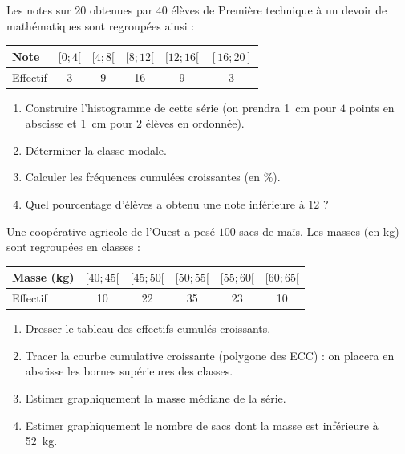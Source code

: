 \documentclass[11pt]{article}
\begin{document}
\begin{exercice}
Les notes sur $20$ obtenues par $40$ élèves de Première technique à un devoir de mathématiques sont regroupées ainsi :
\begin{center}
\begin{tabular}{|l|c|c|c|c|c|}
\hline
Note & $[0 ; 4[$ & $[4 ; 8[$ & $[8 ; 12[$ & $[12 ; 16[$ & $[16 ; 20]$ \\
\hline
Effectif & 3 & 9 & 16 & 9 & 3 \\
\hline
\end{tabular}
\end{center}
\begin{enumerate}
\item Construire l'histogramme de cette série (on prendra \SI{1}{cm} pour $4$ points en abscisse et \SI{1}{cm} pour $2$ élèves en ordonnée).
\item Déterminer la classe modale.
\item Calculer les fréquences cumulées croissantes (en $\%$).
\item Quel pourcentage d'élèves a obtenu une note inférieure à $12$ ?
\end{enumerate}
\end{exercice}

\begin{exercice}
Une coopérative agricole de l'Ouest a pesé $100$ sacs de maïs. Les masses (en kg) sont regroupées en classes :
\begin{center}
\begin{tabular}{|l|c|c|c|c|c|}
\hline
Masse (kg) & $[40 ; 45[$ & $[45 ; 50[$ & $[50 ; 55[$ & $[55 ; 60[$ & $[60 ; 65[$ \\
\hline
Effectif & 10 & 22 & 35 & 23 & 10 \\
\hline
\end{tabular}
\end{center}
\begin{enumerate}
\item Dresser le tableau des effectifs cumulés croissants.
\item Tracer la courbe cumulative croissante (polygone des ECC) : on placera en abscisse les bornes supérieures des classes.
\item Estimer graphiquement la masse médiane de la série.
\item Estimer graphiquement le nombre de sacs dont la masse est inférieure à \SI{52}{kg}.
\end{enumerate}
\end{exercice}
\end{document}
